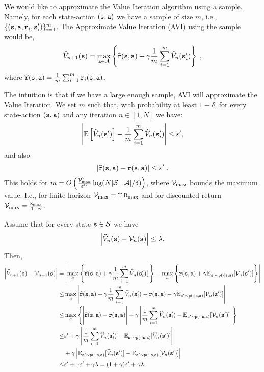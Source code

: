We would like to approximate the Value Iteration algorithm using a
sample. Namely, for each state-action $({\tt s},{\tt a})$ we have a sample of size
$m$, i.e., $\{({\tt s},{\tt a},{\tt r}_i,{\tt s}'_i)\}_{i=1}^{m}$.
The Approximate Value Iteration (AVI) using the sample would be,
\[
\widehat{V}_{n+1}({\tt s})=\max_{{\tt a}\in \mathcal{A}} \left\{
\widehat{{\tt r}}({\tt s},{\tt a})+\gamma \frac{1}{m}\sum_{i=1}^m
\widehat{V}_n({\tt s}'_i)\right\}\;,
\]
where $\widehat{{\tt r}}({\tt s},{\tt a})=\frac{1}{m}\sum_{i=1}^m {\tt r}_i({\tt s},{\tt a})$.

The intuition is that if we have a large enough sample, AVI  will
approximate the Value Iteration. We set $m$ such that, with
probability at least $1-\delta$, for every  state-action $({\tt s},{\tt a})$ and any
iteration $n\in[1,N]$ we have:
\[
\left|\mathbb{E}\left[\widehat{V}_n({\tt s}')\right]-\frac{1}{m}\sum_{i=1}^m
\widehat{V}_n({\tt s}'_i)\right|\leq \varepsilon',
\]
and also
\[
\left|\widehat{{\tt r}}({\tt s},{\tt a})-{\tt r}({\tt s},{\tt a})\right|\leq\varepsilon'\;.
\]
This holds for $m=O\left(\frac{\mathcal{V}^2_{\max}}{\varepsilon'^2}\log (N
|\mathcal{S}|\;|\mathcal{A}|/\delta)\right)$, where $\mathcal{V}_{\max}$ bounds the maximum
value. I.e., for finite horizon $\mathcal{V}_{\max}={\tt T}\; {\tt R}_{\max }$ and for
discounted return $\mathcal{V}_{\max}=\frac{{\tt R}_{\max }}{1-\gamma}$.

Assume that for every state ${\tt s} \in \mathcal{S}$  we have
\[
\left|\widehat{V}_n({\tt s}) - \mathcal{V}_n({\tt s})\right|\leq \lambda.
\]
Then,
\begin{align*}
\left|\widehat{V}_{n+1}(\state)-\Value_{n+1}(\state)\right| =&
\left|\max_a\left\{\widehat{\reward}(\state,\action)+\discount
\frac{1}{m}\sum_{i=1}^m \widehat{V}_n(\state'_i)\}\right\} 
- \max_a 
\Bigg\{
\reward(\state,\action)+\discount \E_{\state'\sim \transitionprob(\cdot
|\state,\action)} [\Value_n(\state')] 
\Bigg\}
\right|\\
\leq& \max_a\left|\widehat{\reward}(\state,\action)+\discount
\frac{1}{m}\sum_{i=1}^m \widehat{V}_n(\state'_i) - 
\reward(\state,\action)-\discount \E_{\state'\sim \transitionprob(\cdot
|\state,\action)} [\Value_n(\state')] \right|\\
\leq& \max_a \left\{\Bigg|\widehat{\reward}(\state,\action)- \reward(\state,\action)\Bigg|
+\discount \left| \frac{1}{m}\sum_{i=1}^m \widehat{V}_n(\state'_i) -
\E_{\state'\sim \transitionprob(\cdot
|\state,\action)} [\Value_n(\state')] \right| \right\}\\
%
\leq & \varepsilon' + \discount \left| \frac{1}{m}\sum_{i=1}^m \widehat{V}_n(\state'_i) -
\E_{\state'\sim \transitionprob(\cdot
|\state,\action)} [\widehat{V}_n(\state')] \right| \\
&+ \discount \left| \E_{\state'\sim \transitionprob(\cdot
|\state,\action)} [\widehat{V}_n(\state')] -
\E_{\state'\sim \transitionprob(\cdot
|\state,\action)} [\Value_n(\state')] \right|\\
 \leq & \varepsilon'+\discount\varepsilon' +\discount\lambda = (1+\discount)\varepsilon' +\discount\lambda.
\end{align*}

